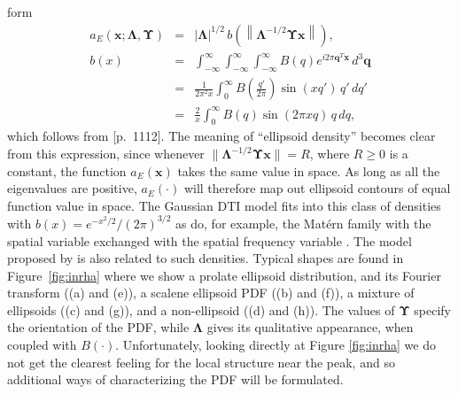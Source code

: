 \documentclass[dvips,aoas,preprint]{imsart}
\numberwithin{equation}{section}
\theoremstyle{plain}
\newcommand{\q}{\mathbf{q}}
\newcommand{\x}{\mathbf{x}}
\newcommand{\bs}[1]{\boldsymbol{#1}}
\begin{document}
form
\begin{eqnarray}\label{ellipsoid2}
  a_E(\x;\bs{\Lambda},\bs{\Upsilon}) &=& |\bs{\Lambda}|^{1/2} \,
  b\left(\left\|\bs{\Lambda}^{-1/2}\bs{\Upsilon}\x\right\|\right),\\
  b(x) &=& \int_{-\infty}^{\infty} \int_{-\infty}^{\infty}
  \int_{-\infty}^{\infty} B(q) e^{i2\pi\q^T\x} \, d^3\q\\
  &=& \frac{1}{2\pi^2 x}\int_0^{\infty}
  B\left(\frac{q'}{2\pi}\right)\sin(xq')\,q'\,dq'\\
  &=& \frac{2}{x}\int_0^{\infty}B(q)\sin(2\pi xq) \,q\,dq,
  \nonumber
\end{eqnarray}
which follows from \citep{grad}[p.~1112].  The meaning of ``ellipsoid
density'' becomes clear from this expression, since whenever
$\|\bs{\Lambda}^{-1/2}\bs{\Upsilon}\x\|=R$, where $R\ge 0$ is a
constant, the function $a_E(\x)$ takes the same value in space.  As
long as all the eigenvalues are positive, $ a_E(\cdot)$ will therefore
map out ellipsoid contours of equal function value in space.  The Gaussian DTI model fits into this class of
densities with $b(x)=e^{-x^2/2}/(2\pi)^{3/2}$ as do, for example, the
Mat\'ern family with the spatial variable exchanged with the spatial
frequency variable \citep{Matern}.  The model proposed by
\citet{Kaden2007} is also related to such densities. Typical shapes are
found in Figure~\ref{fig:inrha} where we show a prolate ellipsoid
distribution, and its Fourier transform ((a) and (e)), a scalene
ellipsoid PDF ((b) and (f)), a mixture of ellipsoids ((c) and (g)),
and a non-ellipsoid ((d) and (h)). The values of $\bm{\Upsilon}$
specify the orientation of the PDF, while $\bm{\Lambda}$ gives its
qualitative appearance, when coupled with $B(\cdot)$. Unfortunately,
looking directly at Figure \ref{fig:inrha} we do not get the clearest
feeling for the local structure near the peak, and so additional ways of
characterizing the PDF will be formulated.
\end{document}
